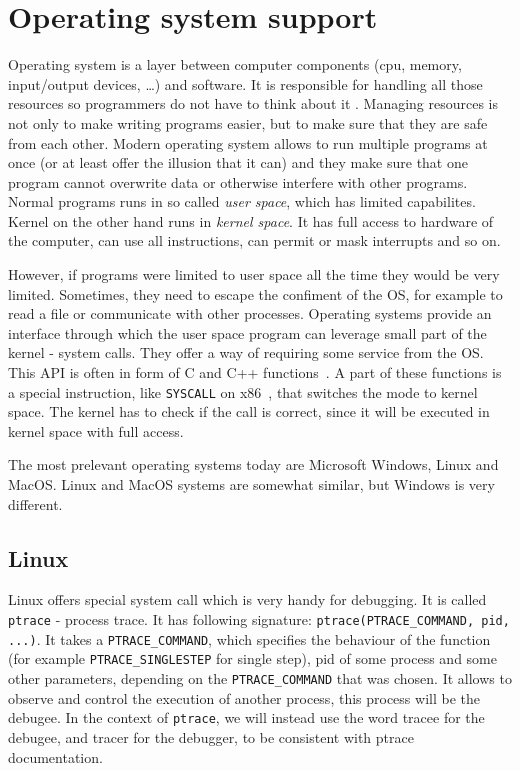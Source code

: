 \section{Operating system support} Operating system is a layer between computer
components (cpu, memory, input/output devices, \dots) and software. It is
responsible for handling all those resources so programmers do not have to
think about it \cite{modern-os, os-concepts}. Managing resources is not only to
make writing programs easier, but to make sure that they are safe from each
other. Modern operating system allows to run multiple programs at once (or at
least offer the illusion that it can) and they make sure that one program
cannot overwrite data or otherwise interfere with other programs. Normal
programs runs in so called \textit{user space}, which has limited capabilites.
Kernel on the other hand runs in \textit{kernel space}. It has full access to
hardware of the computer, can use all instructions, can permit or mask
interrupts and so on.

However, if programs were limited to user space all the time they would be very
limited. Sometimes, they need to escape the confiment of the OS, for example to
read a file or communicate with other processes. Operating systems provide an
interface through which the user space program can leverage small part of the
kernel - system calls. They offer a way of requiring some service from the OS.
This API is often in form of C and C++ functions~\cite{os-concepts}. A part of
these functions is a special instruction, like \texttt{SYSCALL} on
x86~\cite{intel-manual}, that switches the mode to kernel space. The kernel has
to check if the call is correct, since it will be executed in kernel space with
full access.

The most prelevant operating systems today are Microsoft Windows, Linux and MacOS.
Linux and MacOS systems are somewhat similar, but Windows is very different.

\subsection{Linux}
Linux offers special system call which is very handy for debugging. It is
called \texttt{ptrace} \cite{ptrace} - process trace. It has following
signature: \texttt{ptrace(PTRACE\_COMMAND, pid, ...)}. It takes a
\texttt{PTRACE\_COMMAND}, which specifies the behaviour of the function (for
example \texttt{PTRACE\_SINGLESTEP} for single step), pid of some process and
some other parameters, depending on the \texttt{PTRACE\_COMMAND} that was
chosen. It allows to observe and control the execution of another process, this
process will be the debugee. In the context of \texttt{ptrace}, we will instead
use the word tracee for the debugee, and tracer for the debugger, to be
consistent with ptrace documentation.

